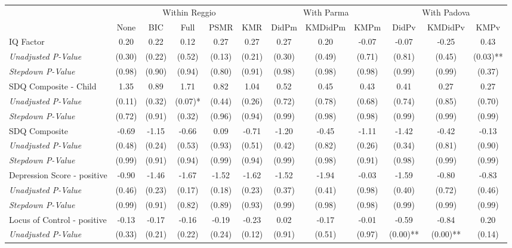 \begin{tabular}{l c c c c c c c c c c c}
\toprule
& \multicolumn{5}{c}{Within Reggio} & \multicolumn{3}{c}{With Parma} & \multicolumn{3}{c}{With Padova} \\\cmidrule(lr){2-6} \cmidrule(lr){7-9} \cmidrule(lr){10-12}
 & None & BIC & Full & PSMR & KMR & DidPm & KMDidPm & KMPm & DidPv & KMDidPv & KMPv \\
\midrule
IQ Factor & 0.20 & 0.22 & 0.12 & 0.27 & 0.27 & 0.27 & 0.20 & -0.07 & -0.07 & -0.25 & 0.43 \\
\quad \textit{Unadjusted P-Value} & (0.30) & (0.22) & (0.52) & (0.13) & (0.21) & (0.30) & (0.49) & (0.71) & (0.81) & (0.45) & (0.03)** \\
\quad \textit{Stepdown P-Value} & (0.98) & (0.90) & (0.94) & (0.80) & (0.91) & (0.98) & (0.98) & (0.98) & (0.99) & (0.99) & (0.37) \\
SDQ Composite - Child & 1.35 & 0.89 & 1.71 & 0.82 & 1.04 & 0.52 & 0.45 & 0.43 & 0.41 & 0.27 & 0.27 \\
\quad \textit{Unadjusted P-Value} & (0.11) & (0.32) & (0.07)* & (0.44) & (0.26) & (0.72) & (0.78) & (0.68) & (0.74) & (0.85) & (0.70) \\
\quad \textit{Stepdown P-Value} & (0.72) & (0.91) & (0.32) & (0.96) & (0.94) & (0.99) & (0.98) & (0.98) & (0.99) & (0.99) & (0.99) \\
SDQ Composite & -0.69 & -1.15 & -0.66 & 0.09 & -0.71 & -1.20 & -0.45 & -1.11 & -1.42 & -0.42 & -0.13 \\
\quad \textit{Unadjusted P-Value} & (0.48) & (0.24) & (0.53) & (0.93) & (0.51) & (0.42) & (0.82) & (0.26) & (0.34) & (0.81) & (0.90) \\
\quad \textit{Stepdown P-Value} & (0.99) & (0.91) & (0.94) & (0.99) & (0.94) & (0.99) & (0.98) & (0.91) & (0.98) & (0.99) & (0.99) \\
Depression Score - positive & -0.90 & -1.46 & -1.67 & -1.52 & -1.62 & -1.52 & -1.94 & -0.03 & -1.59 & -0.80 & -0.83 \\
\quad \textit{Unadjusted P-Value} & (0.46) & (0.23) & (0.17) & (0.18) & (0.23) & (0.37) & (0.41) & (0.98) & (0.40) & (0.72) & (0.46) \\
\quad \textit{Stepdown P-Value} & (0.99) & (0.91) & (0.82) & (0.89) & (0.93) & (0.99) & (0.98) & (0.98) & (0.99) & (0.99) & (0.99) \\
Locus of Control - positive & -0.13 & -0.17 & -0.16 & -0.19 & -0.23 & 0.02 & -0.17 & -0.01 & -0.59 & -0.84 & 0.20 \\
\quad \textit{Unadjusted P-Value} & (0.33) & (0.21) & (0.22) & (0.24) & (0.12) & (0.91) & (0.51) & (0.97) & (0.00)** & (0.00)** & (0.14) \\

\end{tabular}
